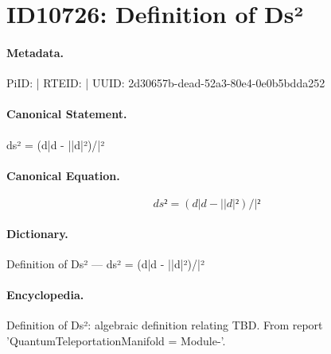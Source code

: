 \section*{ID10726: Definition of Ds²}
\paragraph{Metadata.}
PiID:  | RTEID:  | UUID: 2d30657b-dead-52a3-80e4-0e0b5bdda252

\paragraph{Canonical Statement.}
ds² = (d|d - ||d|²)/|²

\paragraph{Canonical Equation.}
\[
ds² = (d|d - ||d|²)/|²
\]

\paragraph{Dictionary.}
Definition of Ds² — ds² = (d|d - ||d|²)/|²

\paragraph{Encyclopedia.}
Definition of Ds²: algebraic definition relating TBD. From report 'QuantumTeleportationManifold = Module-'.
